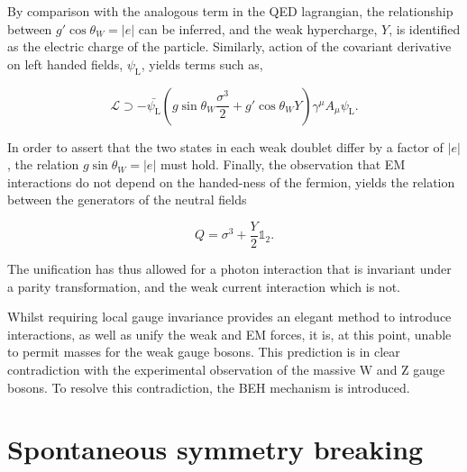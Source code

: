 \noindent By comparison with the analogous term in the QED lagrangian, 
the relationship between $g'\cos{\theta_{W}}=|e|$ can be inferred, and the weak hypercharge, $Y$, is identified as the electric charge of the particle. Similarly, action of the covariant derivative on left handed fields, $\psi_{\mathrm{L}}$, yields terms such as,

\begin{equation}
    \mathcal{L} \supset -\bar{\psi_{\mathrm{L}}}(g\sin{\theta_{W}}\frac{\sigma^{3}}{2} + g'\cos{\theta_{W}}Y)\gamma^{\mu}A_{\mu}\psi_{\mathrm{L}}.
\end{equation}

\noindent In order to assert that the two states in each weak doublet differ by a factor of $|e|$, the relation $g\sin{\theta_{W}}=|e|$ must hold. Finally, the observation that EM interactions do not depend on the handed-ness of the fermion, yields the relation between the generators of the neutral fields

\begin{equation}
    Q = \sigma^{3} + \frac{Y}{2}\mathbb{1}_{2}.
\end{equation}

\noindent The unification has thus allowed for a photon interaction that is invariant under a parity transformation, and the weak current interaction which is not.

Whilst requiring local gauge invariance provides an elegant method to introduce interactions, as well as unify the weak and EM forces, it is, at this point, unable to permit masses for the weak gauge bosons. This prediction is in clear contradiction with the experimental observation of the massive $\mathrm{W}$ and $\mathrm{Z}$ gauge bosons. To resolve this contradiction, the BEH mechanism is introduced.

\section{Spontaneous symmetry breaking}

